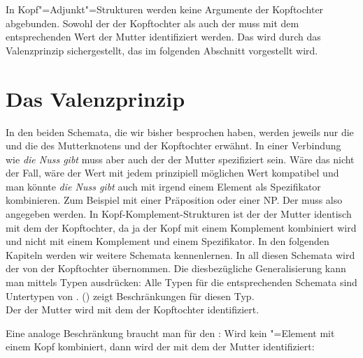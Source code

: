 In Kopf"=Adjunkt"=Strukturen werden keine Argumente der Kopftochter abgebunden. Sowohl der \sprw der
Kopftochter als auch der \compsw muss mit dem entsprechenden Wert der Mutter identifiziert
werden. Das wird durch das Valenzprinzip sichergestellt, das im folgenden Abschnitt vorgestellt wird.

\section{Das Valenzprinzip}

In den beiden Schemata, die wir bisher besprochen haben, werden jeweils nur die \sprwe und die
\compswe des Mutterknotens und der Kopftochter erwähnt. In einer Verbindung wie \emph{die Nuss gibt}
muss aber auch der \sprw der Mutter spezifiziert sein. Wäre das nicht der Fall, wäre der Wert mit
jedem prinzipiell möglichen Wert kompatibel und man könnte \emph{die Nuss gibt} auch mit irgend
einem Element als Spezifikator kombinieren. Zum Beispiel mit einer Präposition oder einer NP. Der
\sprw muss also angegeben werden. In Kopf-Komplement-Strukturen ist der \sprw der Mutter identisch
mit dem \sprw der Kopftochter, da ja der Kopf mit einem Komplement kombiniert wird und nicht mit
einem Komplement und einem Spezifikator. In den folgenden Kapiteln werden wir weitere Schemata
kennenlernen. In all diesen Schemata wird der \sprw von der Kopftochter übernommen. Die
diesbezügliche Generalisierung kann man mittels Typen ausdrücken: Alle Typen für die entsprechenden
Schemata sind Untertypen von . () zeigt Beschränkungen für
diesen Typ.
\ea
\label{type-head-non-specifier-phrase}
 \impl\\
\z
Der \sprw der Mutter wird mit dem der Kopftochter identifiziert.

Eine analoge Beschränkung braucht man für den \compsw: Wird kein \comps"=Element mit
einem Kopf kombiniert, dann wird der \compsw mit dem der Mutter identifiziert:
\ea
\label{type-head-non-complement-phrase}
 \impl\\
\z

